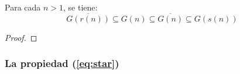 \begin{proposition}
  Para cada $n > 1$, se tiene:
  $$
   \overline{G(r(n))} \subseteq G(n) \subseteq \overline{G(n)} \subseteq G(s(n))
  $$
\end{proposition}

\begin{proof}
  
\end{proof}

\subsubsection{La propiedad (\ref{eq:star})}

